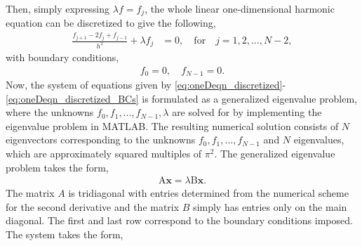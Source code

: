 \documentclass[a4paper, 12pt, twoside, openright]{article}
\numberwithin{equation}{section}
\begin{document}
Then, simply expressing $\lambda f=f_j$, the whole linear one-dimensional harmonic equation can be discretized to give the following,
\begin{align}
\frac{f_{j+1}-2f_j+f_{j-1}}{h^2} + \lambda f_j &= 0, \quad \text{for} \quad j=1,2,\dots,N-2, \label{eq:oneDeqn_discretized}
\end{align}
with boundary conditions, 
\begin{align}
f_0 = 0,\quad f_{N-1}=0. \label{eq:oneDeqn_discretized_BCs}
\end{align}
Now, the system of equations given by \eqref{eq:oneDeqn_discretized}-\eqref{eq:oneDeqn_discretized_BCs} is formulated as a generalized eigenvalue problem, where the unknowns $f_0, f_1,..., f_{N-1},\lambda$ are solved for by implementing the eigenvalue problem in MATLAB. The resulting numerical solution consists of $N$ eigenvectors corresponding to the unknowns $f_0, f_1,..., f_{N-1}$ and $N$ eigenvalues, which are approximately squared multiples of $\pi^2$. The generalized eigenvalue problem takes the form,
\begin{align}
\mathrm{A}\textbf{x} = \lambda \mathrm{B}\textbf{x}.
\end{align}
The matrix $A$ is tridiagonal with entries determined from the numerical scheme for the second derivative and the matrix $B$ simply has entries only on the main diagonal. The first and last row correspond to the boundary conditions imposed. The system takes the form,  
\end{document}
